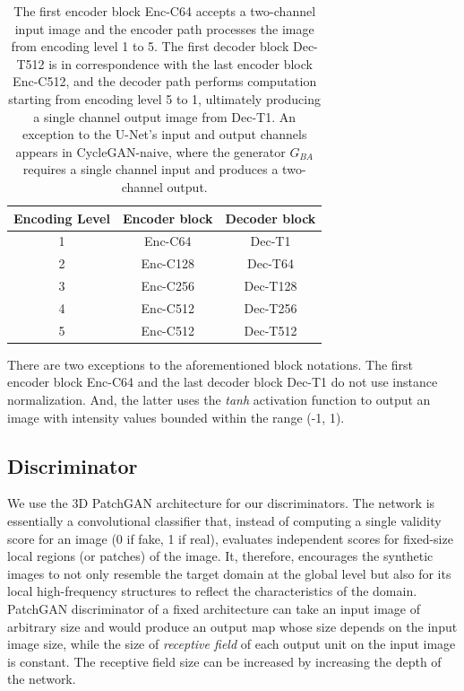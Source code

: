 \begin{table}[h!]
    \centering
    \begin{tabular}{ccc}
        \hline
        \textbf{Encoding Level} & \textbf{Encoder block} & \textbf{Decoder block} \\
        \hline
        1     & Enc-C64          & Dec-T1           \\
        2     & Enc-C128         & Dec-T64          \\
        3     & Enc-C256         & Dec-T128         \\
        4     & Enc-C512         & Dec-T256         \\
        5     & Enc-C512         & Dec-T512         \\
        \hline
    \end{tabular}
    \caption{The first encoder block Enc-C64 accepts a two-channel input image and the encoder path processes the image from encoding level 1 to 5. The first decoder block Dec-T512 is in correspondence with the last encoder block Enc-C512, and the decoder path performs computation starting from encoding level 5 to 1, ultimately producing a single channel output image from Dec-T1. An exception to the U-Net's input and output channels appears in CycleGAN-naive, where the generator $G_{BA}$ requires a single channel input and produces a two-channel output.}
    \label{tab:generator_architecture}
\end{table}

There are two exceptions to the aforementioned block notations. The first encoder block Enc-C64 and the last decoder block Dec-T1 do not use instance normalization. And, the latter uses the \textit{tanh} activation function to output an image with intensity values bounded within the range (-1, 1). 


\subsection{Discriminator}
We use the 3D PatchGAN architecture for our discriminators. The network is essentially a convolutional classifier that, instead of computing a single validity score for an image (0 if fake, 1 if real), evaluates independent scores for fixed-size local regions (or patches) of the image. It, therefore, encourages the synthetic images to not only resemble the target domain at the global level but also for its local high-frequency structures to reflect the characteristics of the domain. PatchGAN discriminator of a fixed architecture can take an input image of arbitrary size and would produce an output map whose size depends on the input image size, while the size of \textit{receptive field} of each output unit on the input image is constant. The receptive field size can be increased by increasing the depth of the network.

